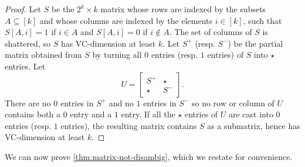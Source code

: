\documentclass[11pt]{article}
\theoremstyle{remark}
\begin{document}
\begin{proof}
    Let $S$ be the $2^k \times k$ matrix whose rows are indexed by the subsets $A \subseteq [k]$ and whose columns are indexed by the elements $i \in [k]$, such that $S[A, i] = 1$ if $i \in A$ and $S[A, i] = 0$ if $i \notin A$.
    The set of columns of $S$ is shattered, so $S$ has VC-dimension at least $k$.
    Let $S^+$ (resp. $S^-$) be the partial matrix obtained from $S$ by turning all $0$ entries (resp. $1$ entries) of $S$ into $\star$ entries.
    Let \[ U =
    \begin{bmatrix}
        S^+ & \star \\
        \star & S^-
    \end{bmatrix}.\]
    There are no $0$ entries in $S^+$ and no $1$ entries in $S^-$ so no row or column of $U$ contains both a $0$ entry and a $1$ entry.
    If all the $\star$ entries of $U$ are cast into $0$ entries (resp. $1$ entries), the resulting matrix contains $S$ as a submatrix, hence has VC-dimension at least $k$.
\end{proof}

We can now prove \cref{thm:matrix-not-disambig}, which we restate for convenience.

\mainmatrix*
\end{document}
